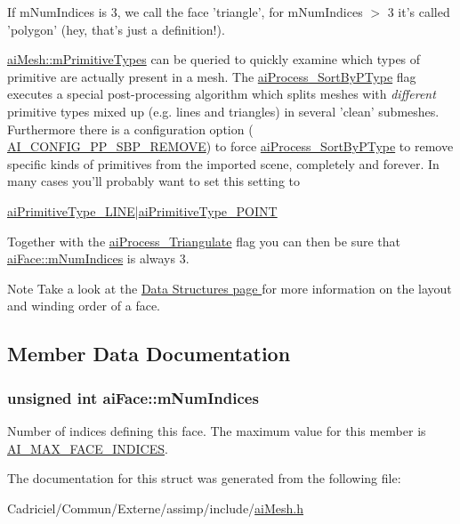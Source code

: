 If m\-Num\-Indices is 3, we call the face 'triangle', for m\-Num\-Indices $>$ 3 it's called 'polygon' (hey, that's just a definition!). \par
 \hyperlink{structai_mesh_a99d66ac0a444068c1b252b30265cbf53}{ai\-Mesh\-::m\-Primitive\-Types} can be queried to quickly examine which types of primitive are actually present in a mesh. The \hyperlink{ai_post_process_8h_a64795260b95f5a4b3f3dc1be4f52e410ab4484f73635d633cd79973bac1431ed6}{ai\-Process\-\_\-\-Sort\-By\-P\-Type} flag executes a special post-\/processing algorithm which splits meshes with {\itshape different} primitive types mixed up (e.\-g. lines and triangles) in several 'clean' submeshes. Furthermore there is a configuration option ( \hyperlink{ai_config_8h_a971e337cb0d526861142586b8341cb98}{A\-I\-\_\-\-C\-O\-N\-F\-I\-G\-\_\-\-P\-P\-\_\-\-S\-B\-P\-\_\-\-R\-E\-M\-O\-V\-E}) to force \hyperlink{ai_post_process_8h_a64795260b95f5a4b3f3dc1be4f52e410ab4484f73635d633cd79973bac1431ed6}{ai\-Process\-\_\-\-Sort\-By\-P\-Type} to remove specific kinds of primitives from the imported scene, completely and forever. In many cases you'll probably want to set this setting to 
\begin{DoxyCode}
\hyperlink{ai_mesh_8h_ac352902280db7c3bd8ba64c133b7f03fa724184f90f0e408b903d07aed39914b4}{aiPrimitiveType\_LINE}|\hyperlink{ai_mesh_8h_ac352902280db7c3bd8ba64c133b7f03fafb9158b4924ec9457647c759aa961053}{aiPrimitiveType\_POINT}
\end{DoxyCode}
 Together with the \hyperlink{ai_post_process_8h_a64795260b95f5a4b3f3dc1be4f52e410a9c3de834f0307f31fa2b1b6d05dd592b}{ai\-Process\-\_\-\-Triangulate} flag you can then be sure that \hyperlink{structai_face_adda2698cec0ebfe651572f4a5701360b}{ai\-Face\-::m\-Num\-Indices} is always 3. \begin{DoxyNote}{Note}
Take a look at the \hyperlink{}{Data Structures page } for more information on the layout and winding order of a face. 
\end{DoxyNote}


\subsection{Member Data Documentation}
\hypertarget{structai_face_adda2698cec0ebfe651572f4a5701360b}{
\subsubsection[{m\-Num\-Indices}]{\setlength{\rightskip}{0pt plus 5cm}unsigned int ai\-Face\-::m\-Num\-Indices}}\label{structai_face_adda2698cec0ebfe651572f4a5701360b}
Number of indices defining this face. The maximum value for this member is \hyperlink{ai_mesh_8h_a380f3ab069e89b3a1ed975577600438b}{A\-I\-\_\-\-M\-A\-X\-\_\-\-F\-A\-C\-E\-\_\-\-I\-N\-D\-I\-C\-E\-S}. 

The documentation for this struct was generated from the following file\-:\begin{DoxyCompactItemize}
\item 
Cadriciel/\-Commun/\-Externe/assimp/include/\hyperlink{ai_mesh_8h}{ai\-Mesh.\-h}\end{DoxyCompactItemize}
